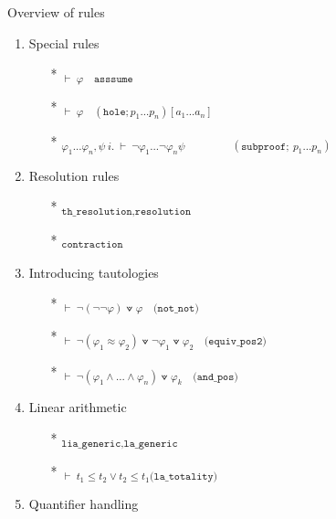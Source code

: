 \documentclass[aspectratio=169,xcolor={dvipsnames}]{beamer}
\begin{document}
\begin{frame}[t]{Overview of rules}
\begin{multicols}{2}
    \begin{enumerate}
        \item Special rules
        \begin{itemize}
            \item[*] \textsubscript{$\vdash~\varphi\quad\texttt{asssume}$}
            \item[*] \textsubscript{$\vdash~\varphi\quad(\texttt{hole}; p_1 \dots p_n)[a_1\dots a_n]$}
            \item[*] \textsubscript{$\varphi_1 \dots \varphi_n, \psi ~ i.~\vdash~ \neg \varphi_1 \dots \neg \varphi_n \psi$}
                    \textsubscript{$\qquad\qquad (\texttt{subproof};~p_1 \dots p_n)$}
        \end{itemize}
        \item Resolution rules
        \begin{itemize}
            \item[*] \textsubscript{$\texttt{th\_resolution,resolution}$}
            \item[*] \textsubscript{$\texttt{contraction}$}
        \end{itemize}
        \item Introducing tautologies
        \begin{itemize}
            \item[*] \textsubscript{$\vdash~ \neg (\neg\neg\varphi) \veedot \varphi \quad\texttt{(not\_not)}$}
            \item[*] \textsubscript{$\vdash~ \neg (\varphi_1 \approx \varphi_2) \veedot \neg \varphi_1 \veedot \varphi_2  \quad\texttt{(equiv\_pos2)}$}
            \item[*] \textsubscript{$\vdash~ \neg (\varphi_1 \land \dots \land \varphi_n) \veedot \varphi_k \quad\texttt{(and\_pos)}$}
        \end{itemize}
        \item Linear arithmetic
        \begin{itemize}
            \item[*] \textsubscript{$\texttt{lia\_generic,la\_generic}$}
            \item[*] \textsubscript{$\vdash~ t_1 \leq t_2 \lor t_2 \leq t_1 \texttt{(la\_totality)}$}
        \end{itemize}
        \item Quantifier handling
        \begin{itemize}

\end{itemize}
\end{enumerate}
\end{multicols}
\end{frame}
\end{document}
